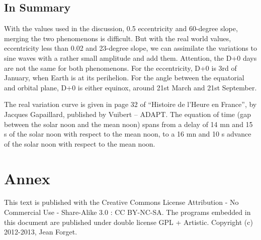 \documentclass[a4paper]{article}
\newenvironment{texte}{\rmfamily}{}
\begin{document}
\begin{texte}
\subsection{In Summary}

With the values used in the discussion, 0.5 eccentricity and 
60-degree slope, merging the two phenomenons is difficult.
But with the real world values, eccentricity less than 0.02
and 23-degree slope, we can assimilate the variations to
sine waves with a rather small amplitude
and add them. Attention, the D+0 days are not the same for
both phenomenons. For the eccentricity, D+0 is 3rd of January,
when Earth is at its perihelion. For the angle between the equatorial
and orbital plane, D+0 is either equinox, around 21st
March and 21st September.

The real variation curve is given in page 32 of
``Histoire de l'Heure en France'', 
by Jacques Gapaillard, published by Vuibert -- ADAPT. 
The equation of time (gap between the solar noon and the
mean noon) spans from a delay of 14 mn and 15 s of the 
solar noon with respect to the mean noon, to a 16 mn and
10 s advance of the solar noon with respect to the mean noon.

\section{Annex}

This text is published with the Creative Commons License
Attribution - No Commercial Use - Share-Alike 
3.0 : CC BY-NC-SA.
The programs embedded in this document are published
under double license GPL + Artistic.
Copyright (c) 2012-2013, Jean Forget.

\end{texte}
\end{document}
